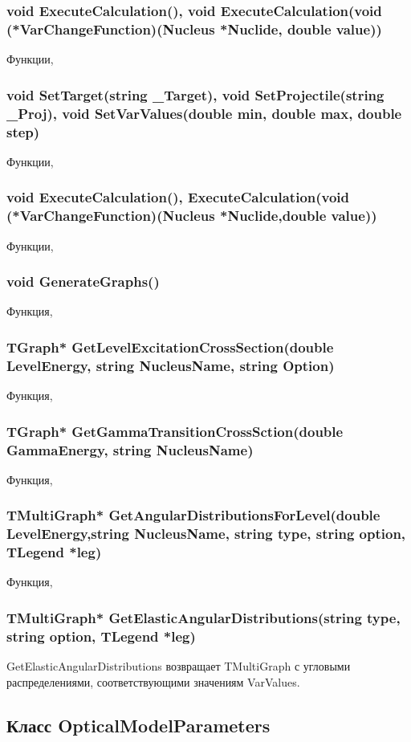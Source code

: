 \documentclass[a4paper,12pt]{extarticle}
\begin{document}
\subsubsection{void ExecuteCalculation(), void ExecuteCalculation(void (*VarChangeFunction)(Nucleus *Nuclide, double value))}
Функции, 
\subsubsection{void SetTarget(string _Target), void SetProjectile(string _Proj), void SetVarValues(double min, double max, double step)}
Функции, 
\subsubsection{void ExecuteCalculation(), ExecuteCalculation(void (*VarChangeFunction)(Nucleus *Nuclide,double value))}
Функции, 
\subsubsection{void GenerateGraphs()}
Функция, 
\subsubsection{TGraph* GetLevelExcitationCrossSection(double LevelEnergy, string NucleusName, string Option)}
Функция, 
\subsubsection{TGraph* GetGammaTransitionCrossSction(double GammaEnergy, string NucleusName)}
Функция, 
\subsubsection{TMultiGraph* GetAngularDistributionsForLevel(double LevelEnergy,string NucleusName, string type, string option, TLegend *leg)}
Функция, 
\subsubsection{TMultiGraph* GetElasticAngularDistributions(string type, string option, TLegend *leg)}
GetElasticAngularDistributions возвращает TMultiGraph с угловыми распределениями, соответствующими значениям VarValues.

\subsection{Класс OpticalModelParameters}
\end{document}
